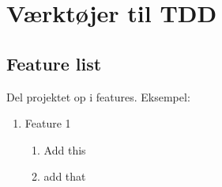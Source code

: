 \documentclass{article}
\begin{document}
\section{Værktøjer til TDD}
\subsection{Feature list}
Del projektet op i features. Eksempel: 
\begin{enumerate}
 	\item Feature 1
 	\begin{enumerate}
 		\item Add this
 		\item add that
 	\end{enumerate}
 \end{enumerate} 
\end{document}
